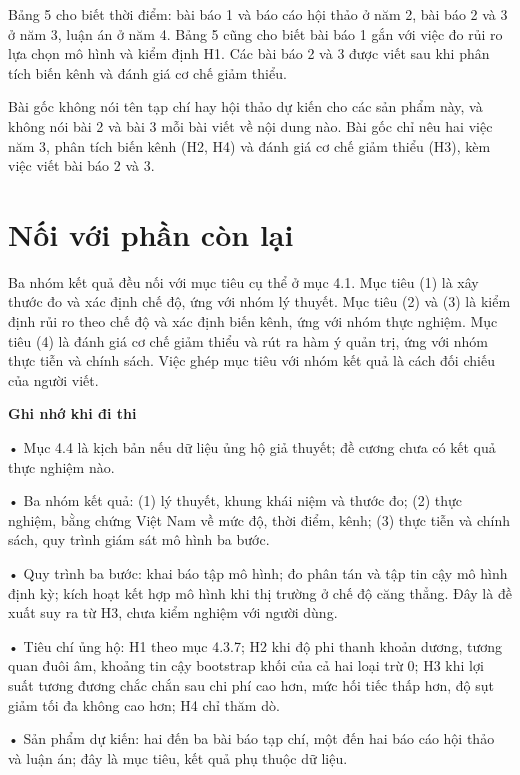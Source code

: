 Bảng 5 cho biết thời điểm: bài báo 1 và báo cáo hội thảo ở năm 2, bài báo 2 và 3 ở năm 3, luận án ở năm 4. Bảng 5 cũng cho biết bài báo 1 gắn với việc đo rủi ro lựa chọn mô hình và kiểm định H1. Các bài báo 2 và 3 được viết sau khi phân tích biến kênh và đánh giá cơ chế giảm thiểu.

Bài gốc không nói tên tạp chí hay hội thảo dự kiến cho các sản phẩm này, và không nói bài 2 và bài 3 mỗi bài viết về nội dung nào. Bài gốc chỉ nêu hai việc năm 3, phân tích biến kênh (H2, H4) và đánh giá cơ chế giảm thiểu (H3), kèm việc viết bài báo 2 và 3.

\section{Nối với phần còn lại}

Ba nhóm kết quả đều nối với mục tiêu cụ thể ở mục 4.1. Mục tiêu (1) là xây thước đo và xác định chế độ, ứng với nhóm lý thuyết. Mục tiêu (2) và (3) là kiểm định rủi ro theo chế độ và xác định biến kênh, ứng với nhóm thực nghiệm. Mục tiêu (4) là đánh giá cơ chế giảm thiểu và rút ra hàm ý quản trị, ứng với nhóm thực tiễn và chính sách. Việc ghép mục tiêu với nhóm kết quả là cách đối chiếu của người viết.

\begin{tcolorbox}[breakable]
\textbf{Ghi nhớ khi đi thi}

• Mục 4.4 là kịch bản nếu dữ liệu ủng hộ giả thuyết; đề cương chưa có kết quả thực nghiệm nào.

• Ba nhóm kết quả: (1) lý thuyết, khung khái niệm và thước đo; (2) thực nghiệm, bằng chứng Việt Nam về mức độ, thời điểm, kênh; (3) thực tiễn và chính sách, quy trình giám sát mô hình ba bước.

• Quy trình ba bước: khai báo tập mô hình; đo phân tán và tập tin cậy mô hình định kỳ; kích hoạt kết hợp mô hình khi thị trường ở chế độ căng thẳng. Đây là đề xuất suy ra từ H3, chưa kiểm nghiệm với người dùng.

• Tiêu chí ủng hộ: H1 theo mục 4.3.7; H2 khi độ phi thanh khoản dương, tương quan đuôi âm, khoảng tin cậy bootstrap khối của cả hai loại trừ 0; H3 khi lợi suất tương đương chắc chắn sau chi phí cao hơn, mức hối tiếc thấp hơn, độ sụt giảm tối đa không cao hơn; H4 chỉ thăm dò.

• Sản phẩm dự kiến: hai đến ba bài báo tạp chí, một đến hai báo cáo hội thảo và luận án; đây là mục tiêu, kết quả phụ thuộc dữ liệu.
\end{tcolorbox}

